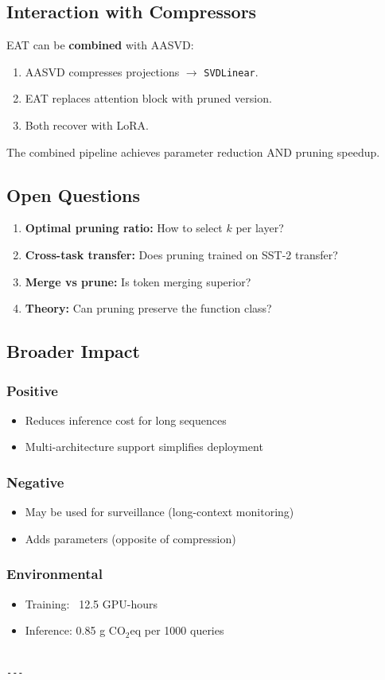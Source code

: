 \subsection{Interaction with Compressors}

EAT can be \textbf{combined} with AASVD:

\begin{enumerate}
\item AASVD compresses projections $\to$ \texttt{SVDLinear}.
\item EAT replaces attention block with pruned version.
\item Both recover with LoRA.

\end{enumerate}
The combined pipeline achieves parameter reduction AND pruning speedup.

\subsection{Open Questions}

\begin{enumerate}
\item \textbf{Optimal pruning ratio:} How to select $k$ per layer?
\item \textbf{Cross-task transfer:} Does pruning trained on SST-2 transfer?
\item \textbf{Merge vs prune:} Is token merging superior?
\item \textbf{Theory:} Can pruning preserve the function class?

\end{enumerate}
\subsection{Broader Impact}

\subsubsection{Positive}
\begin{itemize}
\item Reduces inference cost for long sequences
\item Multi-architecture support simplifies deployment

\end{itemize}
\subsubsection{Negative}
\begin{itemize}
\item May be used for surveillance (long-context monitoring)
\item Adds parameters (opposite of compression)

\end{itemize}
\subsubsection{Environmental}
\begin{itemize}
\item Training: ~12.5 GPU-hours
\item Inference: 0.85 g CO$_2$eq per 1000 queries
\end{itemize}
\begin{lstlisting}

---
\end{lstlisting}